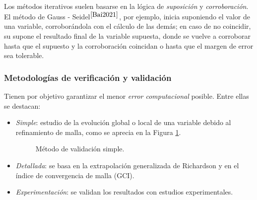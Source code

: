 \noindent
\justify

Los m\'etodos iterativos suelen basarse en la l\'ogica de \textit{suposici\'on} y \textit{corroboraci\'on}. El m\'etodo de Gauss - Seidel$^{\cite{Bai2021}}$, por ejemplo, inicia suponiendo el valor de una variable, corrobor\'andola con el c\'alculo de las dem\'as; en caso de no coincidir, su supone el resultado final de la variable supuesta, donde se vuelve a corroborar hasta que el supuesto y la corroboraci\'on coincidan o hasta que el margen de error sea tolerable.

\subsubsection{Metodolog\'ias de verificaci\'on y validaci\'on} \label{verified}

\noindent
\justify

Tienen por objetivo garantizar el menor \textit{error computacional} posible. Entre ellas se destacan:

\begin{itemize}
	\item \textit{Simple}: estudio de la evoluci\'on global o local de una variable debido al refinamiento de malla, como se aprecia en la Figura \ref{valsimple}.
	\begin{figure}[h!]
	\centering
	\caption{M\'etodo de validaci\'on simple.}
	\label{valsimple}
	\end{figure}
	\item \textit{Detallada}: se basa en la extrapolaci\'on generalizada de Richardson y en el \'indice de convergencia de malla (GCI).
	\item \textit{Experimentaci\'on}: se validan los resultados con estudios experimentales.
\end{itemize}

